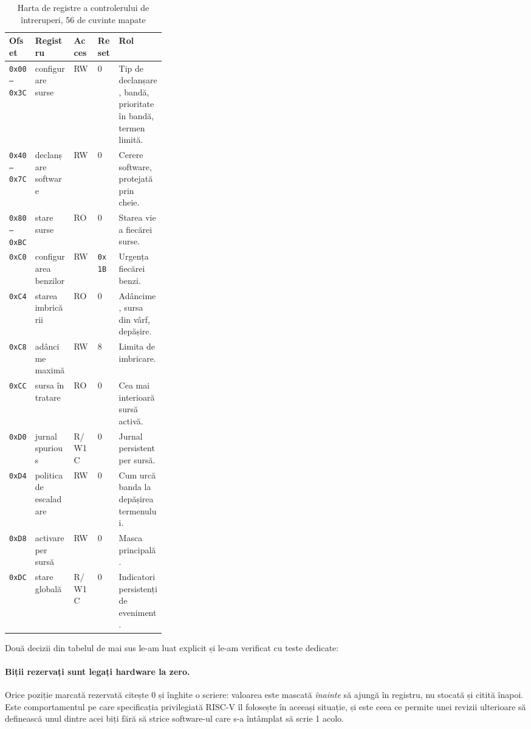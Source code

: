 \documentclass[11pt,openany]{report}
\begin{document}
\begin{table}[H]
\centering
\caption{Harta de registre a controlerului de întreruperi, 56 de cuvinte mapate}
\label{tab:picmap}
\small
\begin{tabular}{@{}llllL{0.30\linewidth}@{}}
\toprule
\textbf{Ofset} & \textbf{Registru} & \textbf{Acces} & \textbf{Reset} & \textbf{Rol} \\
\midrule
\texttt{0x00--0x3C} & configurare surse & RW & 0 & Tip de declanșare, bandă, prioritate în bandă, termen limită. \\
\texttt{0x40--0x7C} & declanșare software & RW & 0 & Cerere software, protejată prin cheie. \\
\texttt{0x80--0xBC} & stare surse & RO & 0 & Starea vie a fiecărei surse. \\
\texttt{0xC0} & configurarea benzilor & RW & \texttt{0x1B} & Urgența fiecărei benzi. \\
\texttt{0xC4} & starea imbricării & RO & 0 & Adâncime, sursa din vârf, depășire. \\
\texttt{0xC8} & adâncime maximă & RW & 8 & Limita de imbricare. \\
\texttt{0xCC} & sursa în tratare & RO & 0 & Cea mai interioară sursă activă. \\
\texttt{0xD0} & jurnal spurious & R/W1C & 0 & Jurnal persistent per sursă. \\
\texttt{0xD4} & politica de escaladare & RW & 0 & Cum urcă banda la depășirea termenului. \\
\texttt{0xD8} & activare per sursă & RW & 0 & Masca principală. \\
\texttt{0xDC} & stare globală & R/W1C & 0 & Indicatori persistenți de eveniment. \\
\bottomrule
\end{tabular}
\end{table}

Două decizii din tabelul de mai sus le-am luat explicit și le-am verificat cu
teste dedicate:

\paragraph{Biții rezervați sunt legați hardware la zero.} Orice poziție marcată
rezervată citește 0 și înghite o scriere: valoarea este mascată \emph{înainte}
să ajungă în registru, nu stocată și citită înapoi. Este comportamentul pe care
specificația privilegiată RISC-V îl folosește în aceeași situație, și este ceea
ce permite unei revizii ulterioare să definească unul dintre acei biți fără să
strice software-ul care s-a întâmplat să scrie 1 acolo.
\end{document}

